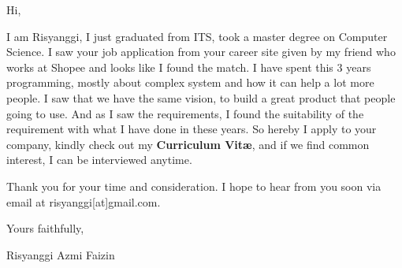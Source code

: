 \documentclass[letterpaper]{deedy-resume} %
\begin{document}
\begin{minipage}[t]{0.7\textwidth}

Hi,
\sectionspace

I am Risyanggi, I just graduated from ITS, took a master degree on Computer Science. I saw your job application from your career site given by my friend who works at Shopee and looks like I found the match. I have spent this 3 years programming, mostly about complex system and how it can help a lot more people. I saw that we have the same vision, to build a great product that people going to use. And as I saw the requirements, I found the suitability of the requirement with what I have done in these years. So hereby I apply to your company, kindly check out my \textbf{Curriculum Vitæ}, and if we find common interest, I can be interviewed anytime.

Thank you for your time and consideration. I hope to hear from you soon via email at risyanggi[at]gmail.com.

\sectionspace
\sectionspace
\sectionspace
\sectionspace
\sectionspace

Yours faithfully,
\sectionspace
\sectionspace
\sectionspace
\sectionspace

Risyanggi Azmi Faizin
\end{minipage} %
\end{document}
